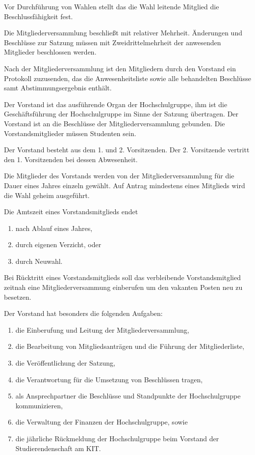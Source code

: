 \documentclass[a4paper, parskip=half, numbers=noenddot]{scrartcl}
\begin{document}
\begin{contract}
Vor Durchführung von Wahlen stellt das die Wahl leitende Mitglied die
Beschlussfähigkeit fest.

Die Mitgliederversammlung beschließt mit relativer Mehrheit.
Änderungen und Beschlüsse zur Satzung müssen mit Zweidrittelmehrheit der
anwesenden Mitglieder beschlossen werden.

Nach der Mitgliederversammlung ist den Mitgliedern durch den Vorstand ein
Protokoll zuzusenden, das die Anwesenheitsliste sowie alle behandelten
Beschlüsse samt Abstimmungsergebnis enthält.



%
%


Der Vorstand ist das ausführende Organ der Hochschulgruppe, ihm ist die
Geschäftsführung der Hochschulgruppe im Sinne der Satzung übertragen.
Der Vorstand ist an die Beschlüsse der Mitgliederversammlung gebunden.
Die Vorstandsmitglieder müssen Studenten sein.

Der Vorstand besteht aus dem 1. und 2. Vorsitzenden.
Der 2. Vorsitzende vertritt den 1. Vorsitzenden bei dessen Abwesenheit.

Die Mitglieder des Vorstands werden von der Mitgliederversammlung für die Dauer
eines Jahres einzeln gewählt. Auf Antrag mindestens eines Mitglieds wird die Wahl geheim ausgeführt.

Die Amtszeit eines Vorstandsmitglieds endet
\begin{enumerate}
  \item nach Ablauf eines Jahres,
  \item durch eigenen Verzicht, oder
  \item durch Neuwahl.
\end{enumerate}
Bei Rücktritt eines Vorstandsmitglieds soll das verbleibende Vorstandsmitglied
zeitnah eine Mitgliederversammung einberufen um den vakanten Posten neu zu
besetzen.

Der Vorstand hat besonders die folgenden Aufgaben:
\begin{enumerate}
  \item die Einberufung und Leitung der Mitgliederversammlung,
  \item die Bearbeitung von Mitgliedsanträgen und die Führung der
    Mitgliederliste,
  \item die Veröffentlichung der Satzung,
  \item die Verantwortung für die Umsetzung von Beschlüssen tragen,
  \item als Ansprechpartner die Beschlüsse und Standpunkte der Hochschulgruppe
    kommunizieren,
  \item die Verwaltung der Finanzen der Hochschulgruppe, sowie
  \item die jährliche Rückmeldung der Hochschulgruppe beim Vorstand der
    Studierendenschaft am KIT.
\end{enumerate}


\end{contract}
\end{document}
